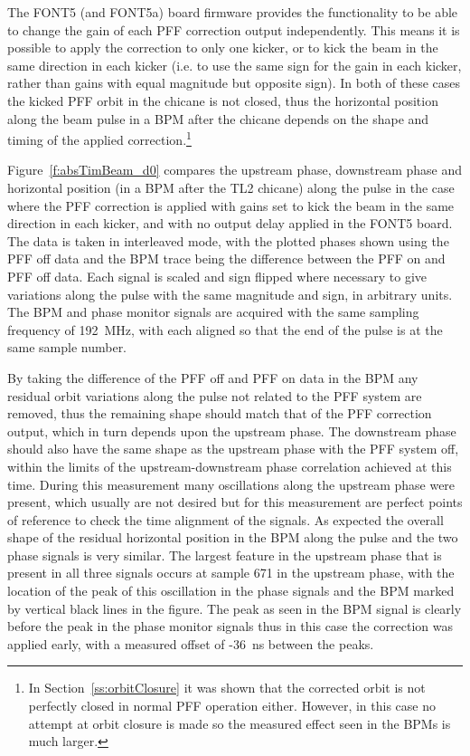 The FONT5 (and FONT5a) board firmware provides the functionality to be able to change the gain of each PFF correction output independently. This means it is possible to apply the correction to only one kicker, or to kick the beam in the same direction in each kicker (i.e. to use the same sign for the gain in each kicker, rather than gains with equal magnitude but opposite sign). In both of these cases the kicked PFF orbit in the chicane is not closed, thus the horizontal position along the beam pulse in a BPM after the chicane depends on the shape and timing of the applied correction.\footnote{In Section~\ref{ss:orbitClosure} it was shown that the corrected orbit is not perfectly closed in normal PFF operation either. However, in this case no attempt at orbit closure is made so the measured effect seen in the BPMs is much larger.}

Figure~\ref{f:absTimBeam_d0} compares the upstream phase, downstream phase and horizontal position (in a BPM after the TL2 chicane) along the pulse in the case where the PFF correction is applied with gains set to kick the beam in the same direction in each kicker, and with no output delay applied in the FONT5 board. The data is taken in interleaved mode, with the plotted phases shown using the PFF off data and the BPM trace being the difference between the PFF on and PFF off data. Each signal is scaled and sign flipped where necessary to give variations along the pulse with the same magnitude and sign, in arbitrary units. The BPM and phase monitor signals are acquired with the same sampling frequency of 192~MHz, with each aligned so that the end of the pulse is at the same sample number. 

By taking the difference of the PFF off and PFF on data in the BPM any residual orbit variations along the pulse not related to the PFF system are removed, thus the remaining shape should match that of the PFF correction output, which in turn depends upon the upstream phase. The downstream phase should also have the same shape as the upstream phase with the PFF system off, within the limits of the upstream-downstream phase correlation achieved at this time. During this measurement many oscillations along the upstream phase were present, which usually are not desired but for this measurement are perfect points of reference to check the time alignment of the signals. As expected the overall shape of the residual horizontal position in the BPM along the pulse and the two phase signals is very similar. The largest feature in the upstream phase that is present in all three signals occurs at sample 671 in the upstream phase, with the location of the peak of this oscillation in the phase signals and the BPM marked by vertical black lines in the figure. The peak as seen in the BPM signal is clearly before the peak in the phase monitor signals thus in this case the correction was applied early, with a measured offset of -36~ns between the peaks.

